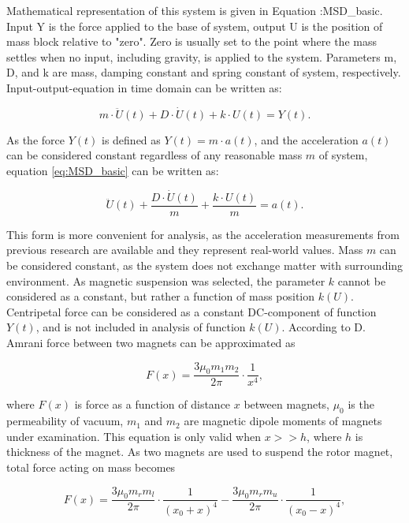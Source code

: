 Mathematical representation of this system is given in Equation :{MSD_basic}. Input Y is the force applied to the base of system, output U is the position of mass block relative to "zero". Zero is usually set to the point where the mass settles when no input, including gravity, is applied to the system. Parameters m, D, and k are mass, damping constant and spring constant of system, respectively. Input-output-equation in time domain can be written as: 

\begin{equation}\label{eq:MSD_basic}
  m \cdot \ddot{U}(t) + D \cdot \dot{U}(t) + k \cdot U(t) = Y(t). 
\end{equation}

As the force $ Y(t) $ is defined as $ Y(t) = m \cdot a(t) $, and the acceleration $ a(t)$ can be considered constant regardless of any reasonable mass $ m $ of system, equation \eqref{eq:MSD_basic} can be written as:

\begin{equation}\label{eq:MSD_acceleration}
 \ddot{U}(t) + \frac{D \cdot \dot{U}(t)}{m} + \frac{k \cdot U(t)}{m} = a(t). 
\end{equation}

This form is more convenient for analysis, as the acceleration measurements from previous research are available and they represent real-world values. Mass $m$ can be considered constant, as the system does not exchange matter with surrounding environment. As magnetic suspension was selected, the parameter $k$ cannot be considered as a constant, but rather a function of mass position $k(U)$. Centripetal force can be considered as a constant DC-component of function $Y(t)$, and is not included in analysis of function $k(U)$. According to D. Amrani \cite{Amrani2015} force between two magnets can be approximated as

\begin{equation}\label{eq:magnetic_force}
  F(x) = \frac{3 \mu_0 m_1 m_2}{2 \pi} \cdot \frac{1}{x^4},
\end{equation}

where $F(x)$ is force as a function of distance $x$ between magnets, $\mu_0$ is the permeability of vacuum, $ m_1 $ and $ m_2 $ are magnetic dipole moments of magnets under examination. This equation is only valid when $x >> h$, where $h$ is thickness of the magnet. As two magnets are used to suspend the rotor magnet, total force acting on mass becomes 

\begin{equation}\label{eq:magnetic_force_middle}
  F(x) = \frac{3 \mu_0 m_r m_l}{2 \pi} \cdot \frac{1}{(x_0+x)^4} - \frac{3 \mu_0 m_r m_u}{2 \pi} \cdot \frac{1}{(x_0-x)^4},
\end{equation}


